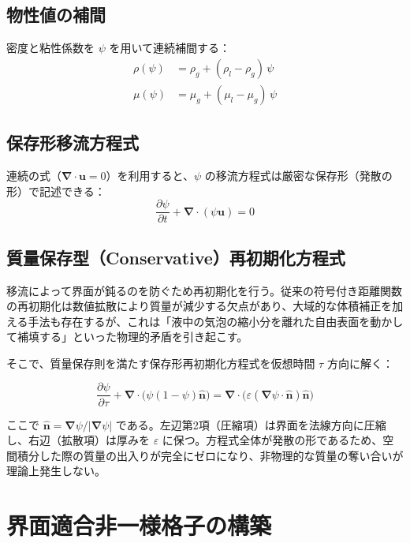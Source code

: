 \documentclass[12pt, a4paper, titlepage, xelatex, ja=standard]{bxjsarticle}
\newcommand{\pd}[2]{\dfrac{\partial #1}{\partial #2}}
\newcommand{\bu}{\bm{u}}
\newcommand{\bnabla}{\bm{\nabla}}
\begin{document}
\subsection{物性値の補間}
密度と粘性係数を $\psi$ を用いて連続補間する：
\begin{align}
  \rho(\psi) &= \rho_g + (\rho_l - \rho_g)\,\psi \\
  \mu(\psi)  &= \mu_g  + (\mu_l  - \mu_g )\,\psi
\end{align}

\subsection{保存形移流方程式}
連続の式（$\bnabla\cdot\bu = 0$）を利用すると、$\psi$ の移流方程式は厳密な保存形（発散の形）で記述できる：
\begin{equation}
  \pd{\psi}{t} + \bnabla \cdot (\psi \bu) = 0
  \label{eq:levelset_adv}
\end{equation}

\subsection{質量保存型（Conservative）再初期化方程式}
\label{sec:reinit}
移流によって界面が鈍るのを防ぐため再初期化を行う。従来の符号付き距離関数の再初期化は数値拡散により質量が減少する欠点があり、大域的な体積補正を加える手法も存在するが、これは「液中の気泡の縮小分を離れた自由表面を動かして補填する」といった物理的矛盾を引き起こす。

そこで、質量保存則を満たす保存形再初期化方程式を仮想時間 $\tau$ 方向に解く：
\begin{tcolorbox}[mybox, title={保存形再初期化方程式}]
\begin{equation}
  \pd{\psi}{\tau} + \bnabla\cdot\bigl(\psi(1-\psi)\hat{\bm{n}}\bigr) = \bnabla\cdot\bigl(\varepsilon(\bnabla\psi\cdot\hat{\bm{n}})\hat{\bm{n}}\bigr)
  \label{eq:reinit_conservative}
\end{equation}
\end{tcolorbox}
ここで $\hat{\bm{n}} = \bnabla\psi/|\bnabla\psi|$ である。左辺第2項（圧縮項）は界面を法線方向に圧縮し、右辺（拡散項）は厚みを $\varepsilon$ に保つ。方程式全体が発散の形であるため、空間積分した際の質量の出入りが完全にゼロになり、非物理的な質量の奪い合いが理論上発生しない。


\section{界面適合非一様格子の構築}
\label{sec:grid}
\end{document}
